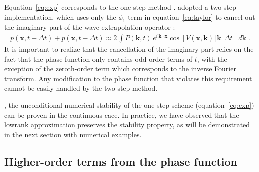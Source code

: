 Equation~\ref{eq:exp} corresponds to the one-step method \cite[]{zhang09,fowler}. \cite{lowrank} adopted a two-step implementation, which uses only the $\phi_1$ term in equation~\ref{eq:taylor} to cancel out the imaginary part of the wave extrapolation operator \cite[]{etgen09abs}:
\begin{eqnarray}
p(\mathbf{x},t+\Delta t) + p(\mathbf{x},t-\Delta t) \approx 
2\,\int P(\mathbf{k},t)\,e^{i\,\mathbf{k} \cdot \mathbf{x}}\cos\left[V(\mathbf{x},\mathbf{k})\,|\mathbf{k}|\,\Delta t\right]\,d\mathbf{k}\;.
\label{eq:cosf}
\end{eqnarray}
It is important to realize that the cancellation of the imaginary part relies on the fact that the phase function only contains odd-order terms of $t$, with the exception of the zeroth-order term which corresponds to the inverse Fourier transform. Any modification to the phase function that violates this requirement cannot be easily handled by the two-step method.

, the unconditional numerical stability of the one-step scheme (equation~\ref{eq:exp}) can be proven in the continuous cace. In practice, we have observed that the lowrank approximation preserves the stability property, as will be demonstrated in the next section with numerical examples.

\subsection{Higher-order terms from the phase function}

